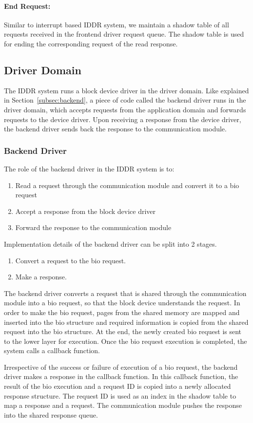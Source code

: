 \paragraph{End Request:}
Similar to interrupt based IDDR system, we maintain a shadow table of all requests received in the frontend driver request queue. The shadow table is used for ending the corresponding request of the read response. 

\subsection{Driver Domain}
The IDDR system runs a block device driver in the driver domain. Like explained in Section~\ref{subsec:backend}, a piece of code called the backend driver runs in the driver domain, which accepts requests from the application domain and forwards requests to the device driver. Upon receiving a response from the device driver, the backend driver sends back the response to the communication module.

\subsubsection*{Backend Driver}
The role of the backend driver in the IDDR system is to:
\begin{enumerate}
\item Read a request through the communication module and convert it to a bio request
\item Accept a response from the block device driver
\item Forward the response to the communication module
\end{enumerate}

Implementation details of the backend driver can be split into 2 stages. 
\begin{enumerate}
\item Convert a request to the bio request. 
\item Make a response.
\end{enumerate}

\label{subsec:createbio}
The backend driver converts a request that is shared through the communication module into a bio request, so that the block device understands the request. In order to make the bio request, pages from the shared memory are mapped and inserted into the bio structure and required information is copied from the shared request into the bio structure. At the end, the newly created bio request is sent to the lower layer for execution. Once the bio request execution is completed, the system calls a callback function.

Irrespective of the success or failure of execution of a bio request, the backend driver makes a response in the callback function. In this callback function, the result of the bio execution and a request ID is copied into a newly allocated response structure. The request ID is used as an index in the shadow table to map a response and a request. The communication module pushes the response into the shared response queue.

% 
